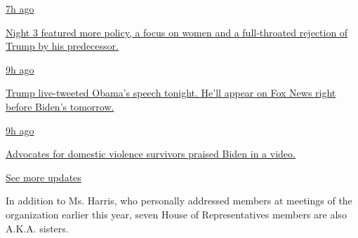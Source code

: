 \href{https://www.nytimes3xbfgragh.onion/live/2020/08/19/us/dnc-convention-election?action=click\&pgtype=Article\&state=default\&region=MAIN_CONTENT_1\&context=storylines_live_updates\#night-3-featured-more-policy-a-focus-on-women-and-a-full-throated-rejection-of-trump-by-his-predecessor}{7h
ago}

\href{https://www.nytimes3xbfgragh.onion/live/2020/08/19/us/dnc-convention-election?action=click\&pgtype=Article\&state=default\&region=MAIN_CONTENT_1\&context=storylines_live_updates\#night-3-featured-more-policy-a-focus-on-women-and-a-full-throated-rejection-of-trump-by-his-predecessor}{Night
3 featured more policy, a focus on women and a full-throated rejection
of Trump by his predecessor.}

\href{https://www.nytimes3xbfgragh.onion/live/2020/08/19/us/dnc-convention-election?action=click\&pgtype=Article\&state=default\&region=MAIN_CONTENT_1\&context=storylines_live_updates\#trump-live-tweeted-obamas-speech-tonight-hell-appear-on-fox-news-right-before-bidens-tomorrow}{9h
ago}

\href{https://www.nytimes3xbfgragh.onion/live/2020/08/19/us/dnc-convention-election?action=click\&pgtype=Article\&state=default\&region=MAIN_CONTENT_1\&context=storylines_live_updates\#trump-live-tweeted-obamas-speech-tonight-hell-appear-on-fox-news-right-before-bidens-tomorrow}{Trump
live-tweeted Obama's speech tonight. He'll appear on Fox News right
before Biden's tomorrow.}

\href{https://www.nytimes3xbfgragh.onion/live/2020/08/19/us/dnc-convention-election?action=click\&pgtype=Article\&state=default\&region=MAIN_CONTENT_1\&context=storylines_live_updates\#advocates-for-domestic-violence-survivors-praised-biden-in-a-video}{9h
ago}

\href{https://www.nytimes3xbfgragh.onion/live/2020/08/19/us/dnc-convention-election?action=click\&pgtype=Article\&state=default\&region=MAIN_CONTENT_1\&context=storylines_live_updates\#advocates-for-domestic-violence-survivors-praised-biden-in-a-video}{Advocates
for domestic violence survivors praised Biden in a video.}

\href{https://www.nytimes3xbfgragh.onion/live/2020/08/19/us/dnc-convention-election?action=click\&pgtype=Article\&state=default\&region=MAIN_CONTENT_1\&context=storylines_live_updates}{See
more updates}

In addition to Ms. Harris, who personally addressed members at meetings
of the organization earlier this year, seven House of Representatives
members are also A.K.A. sisters.

